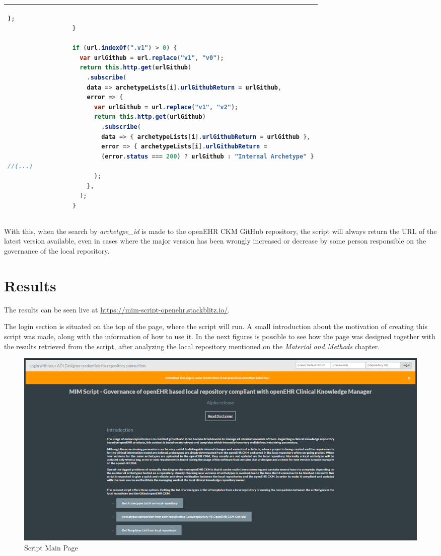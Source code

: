 \documentclass[mim_thesis.tex]{subfiles}
\begin{document}
\begin{table}[H]
\begin{tabular}{l}
\begin{lstlisting}[language=java]
                      );
                  }
                  
                  if (url.indexOf(".v1") > 0) {
                    var urlGithub = url.replace("v1", "v0");
                    return this.http.get(urlGithub)
                      .subscribe(
                      data => archetypeLists[i].urlGithubReturn = urlGithub,
                      error => {
                        var urlGithub = url.replace("v1", "v2");
                        return this.http.get(urlGithub)
                          .subscribe(
                          data => { archetypeLists[i].urlGithubReturn = urlGithub },
                          error => { archetypeLists[i].urlGithubReturn = 
                          (error.status === 200) ? urlGithub : "Internal Archetype" }
//(...)
                        );
                      },
                    );
                  }
\end{lstlisting}
\tabularnewline \bottomrule[2pt]
\end{tabular}
\end{table}

With this, when the search by \textit{archetype\_id} is made to the openEHR CKM GitHub repository, the script will always return the URL of the latest version available, even in cases where the major version has been wrongly increased or decrease by some person responsible on the governance of the local repository. 


\section{Results}

The results can be seen live at \url{https://mim-script-openehr.stackblitz.io/}.

The login section is situated on the top of the page, where the script will run. A small introduction about the motivation of creating this script was made, along with the information of how to use it. In the next figures is possible to see how the page was designed together with the results retrieved from the script, after analyzing the local repository mentioned on the \textit{Material and Methods} chapter. 

\begin{figure}[H]
	\centering
    \includegraphics[width=1\textwidth]{img/script_main_page.PNG}
	\caption{Script Main Page }
	\label{fig:script_main_page}
\end{figure}
\end{document}

